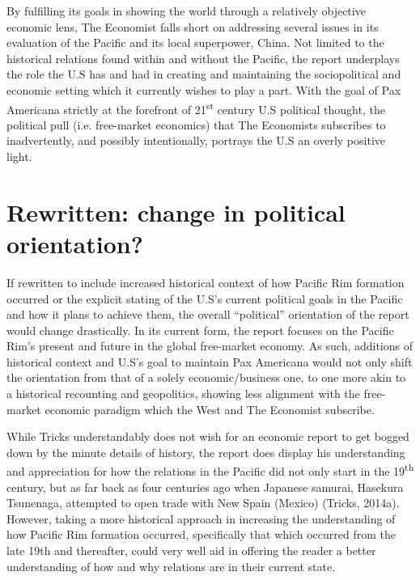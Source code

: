 \documentclass[man,donotrepeattitle,letter]{apa6}
\begin{document}
By fulfilling its goals in showing the world through a relatively objective economic lens, The Economist falls short on addressing several issues in its evaluation of the Pacific and its local superpower, China.  Not limited to the historical relations found within and without the Pacific, the report underplays the role the U.S has and had in creating and maintaining the sociopolitical and economic setting which it currently wishes to play a part. With the goal of Pax Americana strictly at the forefront of 21\textsuperscript{st} century U.S political thought, the political pull (i.e. free-market economics) that The Economists subscribes to inadvertently, and possibly intentionally, portrays the U.S an overly positive light.

\section{Rewritten: change in political orientation?}
If rewritten to include increased historical context of how Pacific Rim formation occurred or the explicit stating of the U.S's current political goals in the Pacific and how it plans to achieve them, the overall ``political'' orientation of the report would change drastically.  In its current form, the report focuses on the Pacific Rim's present and future in the global free-market economy.  As such, additions of historical context and U.S's goal to maintain Pax Americana would not only shift the orientation from that of a solely economic/business one, to one more akin to a historical recounting and geopolitics, showing less alignment with the free-market economic paradigm which the West and The Economist subscribe.

While Tricks understandably does not wish for an economic report to get bogged down by the minute details of history, the report does display his understanding and appreciation for how the relations in the Pacific did not only start in the 19\textsuperscript{th} century, but as far back as four centuries ago when Japanese samurai, Hasekura Tsunenaga, attempted to open trade with New Spain (Mexico) (Tricks, 2014a).  However, taking a more historical approach in increasing the understanding of how Pacific Rim formation occurred, specifically that which occurred from the late 19th and thereafter, could very well aid in offering the reader a better understanding of how and why relations are in their current state.
\end{document}
